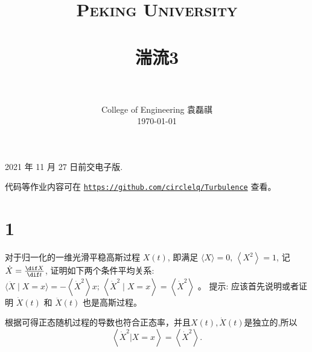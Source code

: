\documentclass[12pt,a4]{ctexart}
\title{
   \vspace{-1in}
   \usefont{OT1}{bch}{b}{n}
   \normalfont \normalsize \textsc{\LARGE Peking University}\\[1cm] %
   \horrule{0.5pt} \\[0.5cm]
   \huge \bfseries{湍流3} \\
   \horrule{2pt} \\[0.5cm]
}
\author{
   \normalfont									\normalsize
   College of Engineering \quad 2001111690  \quad 袁磊祺\\	\normalsize
   \today
}
\date{}
\begin{document}


\maketitle

2021 年 11 月 27 日前交电子版.

代码等作业内容可在 \texttt{\href{https://github.com/circlelq/Turbulence}{https://github.com/circlelq/Turbulence}} 查看。


\section{1}


对于归一化的一维光滑平稳高斯过程 $X(t)$,  即满足 $\langle X\rangle=0,\, \left\langle X^{2}\right\rangle=1$, 记 $\dot{X}=\frac{\dif X}{\dif t}$, 证明如下两个条件平均关系: $\langle\ddot{X} \mid X=x\rangle=-\left\langle\dot{X}^{2}\right\rangle x ;\, \left\langle\dot{X}^{2} \mid X=x\right\rangle=\left\langle\dot{X}^{2}\right\rangle$ 。 提示: 应该首先说明或者证明 $\dot{X}(t)$ 和 $\ddot{X}(t)$ 也是高斯过程。

根据\cite[P45]{pan}可得正态随机过程的导数也符合正态率，并且$X(t),\dot{X}(t)$是独立的,所以
\begin{equation}
   \left< \dot{X}^2 \big| X = x \right> = \left< \dot{X}^2 \right>.
\end{equation}
\end{document}
